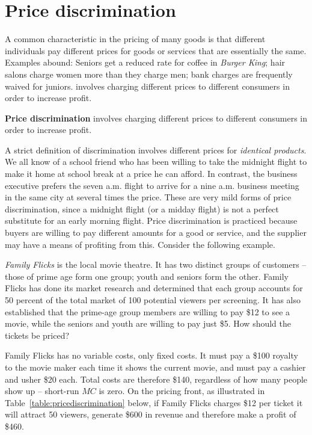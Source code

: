 \section{Price discrimination}\label{sec:ch10sec5}

A common characteristic in the pricing of many goods is that different
individuals pay different prices for goods or services that are essentially
the same. Examples abound: Seniors get a reduced rate for coffee in 
\textit{Burger King}; hair salons charge women more than they charge men; bank
charges are frequently waived for juniors. 
involves charging different prices to different consumers in order to
increase profit.

\begin{DefBox}
	\textbf{Price discrimination} involves charging different prices to different consumers in order to increase profit.
\end{DefBox}

A strict definition of discrimination involves different prices for 
\textit{identical products}. We all know of a school friend who has been willing to
take the midnight flight to make it home at school break at a price he can
afford. In contrast, the business executive prefers the seven a.m.
flight to arrive for a nine a.m. business meeting in the same city
at several times the price. These are very mild forms of price
discrimination, since a midnight flight (or a midday flight) is not a
perfect substitute for an early morning flight. Price discrimination is
practiced because buyers are willing to pay different amounts for a good or
service, and the supplier may have a means of profiting from this. Consider
the following example.

\newhtmlpage

\textit{Family Flicks} is the local movie theatre. It has two distinct
groups of customers -- those of prime age form one group; youth and seniors
form the other. Family Flicks has done its market research and determined
that each group accounts for 50 percent of the total market of 100 potential
viewers per screening. It has also established that the prime-age group
members are willing to pay \$12 to see a movie, while the seniors and youth
are willing to pay just \$5. How should the tickets be priced?

Family Flicks has no variable costs, only fixed costs. It must pay a \$100
royalty to the movie maker each time it shows the current movie, and must
pay a cashier and usher \$20 each. Total costs are therefore \$140,
regardless of how many people show up -- short-run $MC$ is zero. On the
pricing front, as illustrated in Table~\ref{table:pricediscrimination}
below, if Family Flicks charges \$12 per ticket it will attract 50 viewers,
generate \$600 in revenue and therefore make a profit of \$460.

